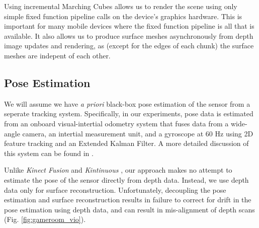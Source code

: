 Using incremental Marching Cubes allows us to render the scene using only simple
fixed function pipeline calls on the device's graphics hardware. This is
important for many mobile devices where the fixed function pipeline is all that
is available. It also allows us to produce surface meshes asynchronously from
depth image updates and rendering, as (except for the edges of  each chunk) the
surface meshes are indepent of each other.

\subsection{Pose Estimation}
We will assume we  have \textit{a priori} black-box pose estimation of
the sensor from a seperate tracking system. Specifically, in our experiments,
pose data is estimated from an onboard visual-intertial odometry system that
fuses data from a wide-angle camera, an intertial measurement unit, and a
gyroscope at 60 Hz using 2D feature tracking and an Extended Kalman Filter. A
more detailed discussion of this system can be found in \cite{VINS}. 

Unlike \textit{Kinect Fusion} \cite{Newcombe} and \textit{Kintinuous}
\cite{Whelan2013}, our approach makes no attempt to estimate the pose of the
sensor directly from depth data. Instead, we use depth data only for surface
reconstruction. Unfortunately, decoupling the pose estimation and surface
reconstruction results in failure to correct for drift in the pose estimation
using depth data, and can result in mis-alignment of depth scans (Fig.
\ref{fig:gameroom_vio}).

